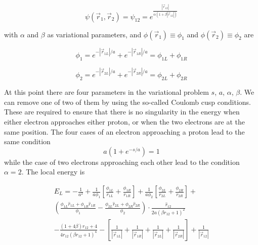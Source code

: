 \documentclass{article}
\begin{document}
\begin{equation}
\psi(\vec{r}_1,\vec{r}_2) = \psi_{12} = e^{\frac{\left| \vec{r}_{12}  \right|}{\alpha(1+\beta |\vec{r}_{12}|)} }
\end{equation}

with $\alpha$ and $\beta$ as variational parameters, and $\phi(\vec{r}_1) \equiv \phi_1$ and $\phi(\vec{r}_2) \equiv \phi_2$ are

\begin{equation}
 \phi_1 = e^{-|\vec{r}_{1L}|/a} + e^{-|\vec{r}_{1R}|/a} = \phi_{1L} +\phi_{1R}
\end{equation}

\begin{equation}
 \phi_2 = e^{-|\vec{r}_{2L}|/a} + e^{-|\vec{r}_{2R}|/a} = \phi_{2L} +\phi_{2R}
\end{equation}

At this point there are four parameters in the variational problem $s$, $a$, $\alpha$, $\beta$. We can remove one of two of them by using the so-called Coulomb cusp conditions. These are required to ensure that there is no singularity in the energy when either electron approaches either proton, or when the two electrons are at the same position. The four cases of an electron approaching a proton lead to the same condition 
\begin{equation}
\label{cusp}
 a(1+e^{-s/a}) =1
\end{equation}
while the case of two electrons approaching each other lead to the condition $\alpha=2$. The local energy is 

 \begin{multline}
 E_L = -\frac{1}{a^2} + \frac{1}{a\phi_1}\left[ \frac{\phi_{1L}}{r_{1L}}+\frac{\phi_{1R}}{r_{1R}} \right] + \frac{1}{a\phi_2} \left[ \frac{\phi_{2L}}{r_{2L}}+\frac{\phi_{2R}}{r_{2R}}\right]
 + \\ \left(  \frac{\phi_{1L}\hat{r}_{1L}+\phi_{1R}\hat{r}_{1R}}{\phi_1}   -    \frac{\phi_{2L}\hat{r}_{2L}+\phi_{2R}\hat{r}_{2R}}{\phi_2}     \right) \cdot \frac{\hat{r}_{12}}{2 a(\beta r_{12}+1)^2} \\
  -   \frac{(1+4 \beta) r_{12} + 4}{4r_{12}(\beta r_{12}+1)^4} 
  - \left[ \frac{1}{|\vec{r}_{1L}|} +\frac{1}{|\vec{r}_{1R}|}+\frac{1}{|\vec{r}_{2L}|}+\frac{1}{|\vec{r}_{2R}|} \right] +\frac{1}{\left| \vec{r}_{12} \right|} 
\end{multline}
\end{document}
